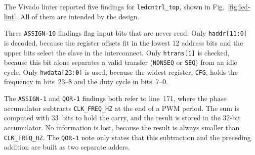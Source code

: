 The Vivado linter reported five findings for \texttt{ledcntrl\_top}, shown in
Fig.~\ref{fig:led-lint}. All of them are intended by the design.

Three \texttt{ASSIGN-10} findings flag input bits that are never read. Only
\texttt{haddr[11:0]} is decoded, because the register offsets fit in the
lowest 12 address bits and the upper bits select the slave in the
interconnect. Only \texttt{htrans[1]} is checked, because this bit alone
separates a valid transfer (\texttt{NONSEQ} or \texttt{SEQ}) from an idle
cycle. Only \texttt{hwdata[23:0]} is used, because the widest register,
\texttt{CFG}, holds the frequency in bits~23--8 and the duty cycle in
bits~7--0.

The \texttt{ASSIGN-1} and \texttt{QOR-1} findings both refer to line~171,
where the phase accumulator subtracts \texttt{CLK\_FREQ\_HZ} at the end of a
PWM period. The sum is computed with 33~bits to hold the carry, and the
result is stored in the 32-bit accumulator. No information is lost, because
the result is always smaller than \texttt{CLK\_FREQ\_HZ}. The
\texttt{QOR-1} note only states that this subtraction and the preceding
addition are built as two separate adders.
